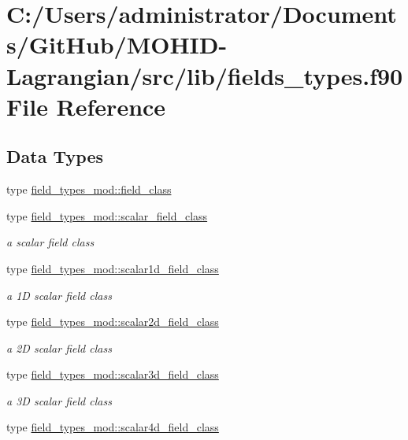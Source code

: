 \hypertarget{fields__types_8f90}{}\section{C\+:/\+Users/administrator/\+Documents/\+Git\+Hub/\+M\+O\+H\+I\+D-\/\+Lagrangian/src/lib/fields\+\_\+types.f90 File Reference}
\label{fields__types_8f90}
\subsection*{Data Types}
\begin{DoxyCompactItemize}
\item 
type \mbox{\hyperlink{structfield__types__mod_1_1field__class}{field\+\_\+types\+\_\+mod\+::field\+\_\+class}}
\item 
type \mbox{\hyperlink{structfield__types__mod_1_1scalar__field__class}{field\+\_\+types\+\_\+mod\+::scalar\+\_\+field\+\_\+class}}
\begin{DoxyCompactList}\small\item\em a scalar field class \end{DoxyCompactList}\item 
type \mbox{\hyperlink{structfield__types__mod_1_1scalar1d__field__class}{field\+\_\+types\+\_\+mod\+::scalar1d\+\_\+field\+\_\+class}}
\begin{DoxyCompactList}\small\item\em a 1D scalar field class \end{DoxyCompactList}\item 
type \mbox{\hyperlink{structfield__types__mod_1_1scalar2d__field__class}{field\+\_\+types\+\_\+mod\+::scalar2d\+\_\+field\+\_\+class}}
\begin{DoxyCompactList}\small\item\em a 2D scalar field class \end{DoxyCompactList}\item 
type \mbox{\hyperlink{structfield__types__mod_1_1scalar3d__field__class}{field\+\_\+types\+\_\+mod\+::scalar3d\+\_\+field\+\_\+class}}
\begin{DoxyCompactList}\small\item\em a 3D scalar field class \end{DoxyCompactList}\item 
type \mbox{\hyperlink{structfield__types__mod_1_1scalar4d__field__class}{field\+\_\+types\+\_\+mod\+::scalar4d\+\_\+field\+\_\+class}}

\end{DoxyCompactItemize}
